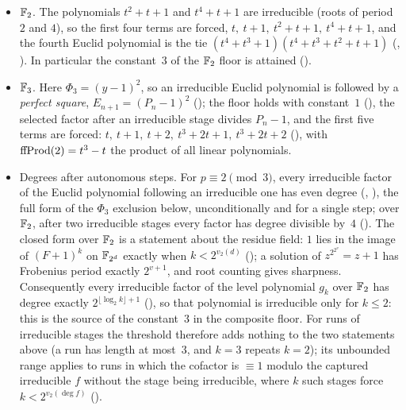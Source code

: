 \begin{itemize}[nosep,leftmargin=1em]
\item $\mathbb{F}_2$.  The polynomials $t^2+t+1$ and $t^4+t+1$ are irreducible
  (roots of period $2$ and $4$), so the first four terms are forced,
  $t,\ t+1,\ t^2+t+1,\ t^4+t+1$, and the fourth Euclid polynomial is the
  tie $(t^4+t^3+1)(t^4+t^3+t^2+t+1)$
  (,
  ).  In
  particular the constant~$3$ of the $\mathbb{F}_2$ floor is attained
  ().
\item $\mathbb{F}_3$.  Here $\Phi_3 = (y-1)^2$, so an irreducible Euclid polynomial
  is followed by a \emph{perfect square}, $E_{n+1} = (P_n-1)^2$
  (); the floor
  holds with constant~$1$
  (), the
  selected factor after an irreducible stage divides $P_n - 1$, and the
  first five terms are forced: $t,\ t+1,\ t+2,\ t^3+2t+1,\ t^3+2t+2$
  (), with
  $\mathrm{ffProd}(2) = t^3 - t$ the product of all linear polynomials.
\item Degrees after autonomous steps.  For $p \equiv 2 \pmod 3$, every
  irreducible factor of the Euclid polynomial following an irreducible one
  has even degree
  (,
  ),
  the full form of the $\Phi_3$ exclusion below, unconditionally and for a
  single step; over $\mathbb{F}_2$, after two irreducible stages every factor has
  degree divisible by~$4$
  ().
  The closed form over $\mathbb{F}_2$ is a statement about the residue field: $1$
  lies in the image of $(F+1)^k$ on $\mathbb{F}_{2^d}$ exactly when
  $k < 2^{v_2(d)}$
  ();
  a solution of $z^{2^{2^v}} = z + 1$ has Frobenius period exactly
  $2^{v+1}$, and root counting gives sharpness.  Consequently every
  irreducible factor of the level polynomial $g_k$ over $\mathbb{F}_2$ has
  degree exactly $2^{\lfloor\log_2 k\rfloor+1}$
  (),
  so that polynomial is irreducible only for $k\le 2$: this is the source of
  the constant~$3$ in the composite floor.  For runs of irreducible stages
  the threshold therefore adds nothing to the two statements above (a run
  has length at most~$3$, and $k=3$ repeats $k=2$); its unbounded range
  applies to runs in which the cofactor is $\equiv 1$ modulo the captured
  irreducible $f$ without the stage being irreducible, where $k$ such stages
  force $k < 2^{v_2(\deg f)}$
  ().
\end{itemize}

